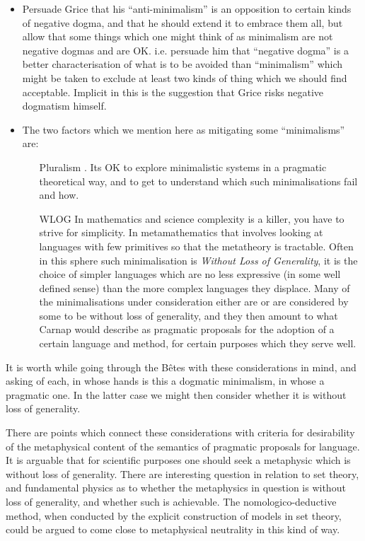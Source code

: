 \documentclass[10pt,titlepage]{book}
\begin{document}
\begin{itemize}
\item Persuade Grice that his ``anti-minimalism'' is an opposition to certain kinds of negative dogma, and that he should extend it to embrace them all, but allow that some things which one might think of as minimalism are not negative dogmas and are OK.
i.e. persuade him that ``negative dogma'' is a better characterisation of what is to be avoided than ``minimalism'' which might be taken to exclude at least two kinds of thing which we should find acceptable.
Implicit in this is the suggestion that Grice risks negative dogmatism himself.

\item The two factors which we mention here as mitigating some ``minimalisms'' are:

\begin{itemize}

\item [Pluralism].  Its OK to explore minimalistic systems in a pragmatic theoretical way, and to get to understand which such minimalisations fail and how.

\item [WLOG] In mathematics and science complexity is a killer, you have to strive for simplicity.
In metamathematics that involves looking at languages with few primitives so that the metatheory is tractable.
Often in this sphere such minimalisation is {\it Without Loss of Generality}, it is the choice of simpler languages which are no less expressive (in some well defined sense) than the more complex languages they displace.
Many of the minimalisations under consideration either are or are considered by some to be without loss of generality, and they then amount to what Carnap would describe as pragmatic proposals for the adoption of a certain language and method, for certain purposes which they serve well.
\end{itemize}

\end{itemize}

It is worth while going through the B\^etes with these considerations in mind, and asking of each, in whose hands is this a dogmatic minimalism, in whose a pragmatic one.
In the latter case we might then consider whether it is without loss of generality.

There are points which connect these considerations with criteria for desirability of the metaphysical content of the semantics of pragmatic proposals for language.
It is arguable that for scientific purposes one should seek a metaphysic which is without loss of generality.
There are interesting question in relation to set theory, and fundamental physics as to whether the metaphysics in question is without loss of generality, and whether such is achievable.
The nomologico-deductive method, when conducted by the explicit construction of models in set theory, could be argued to come close to metaphysical neutrality in this kind of way.
\end{document}
